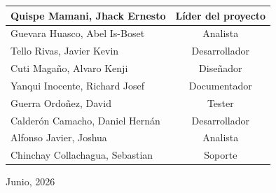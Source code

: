 \documentclass[11pt, a4paper, oneside]{report}
\begin{document}
\begin{titlepage}
\begin{tabular}{@{}|l|c|@{}}
    {\color{body_gray}\small Quispe Mamani, Jhack Ernesto} & {\color{body_gray}\small Líder del proyecto} \\ \hline
    {\color{body_gray}\small Guevara Huasco, Abel Is-Boset} & {\color{body_gray}\small Analista} \\ \hline
    {\color{body_gray}\small Tello Rivas, Javier Kevin} & {\color{body_gray}\small Desarrollador} \\ \hline
    {\color{body_gray}\small Cuti Magaño, Alvaro Kenji} & {\color{body_gray}\small Diseñador} \\ \hline
    {\color{body_gray}\small Yanqui Inocente, Richard Josef} & {\color{body_gray}\small Documentador} \\ \hline
    {\color{body_gray}\small Guerra Ordoñez, David} & {\color{body_gray}\small Tester} \\ \hline
    {\color{body_gray}\small Calderón Camacho, Daniel Hernán} & {\color{body_gray}\small Desarrollador} \\ \hline
    {\color{body_gray}\small Alfonso Javier, Joshua} & {\color{body_gray}\small Analista} \\ \hline
    {\color{body_gray}\small Chinchay Collachagua, Sebastian} & {\color{body_gray}\small Soporte} \\ \hline
  \end{tabular}

  \vspace{0.6cm}
  {\color{body_gray} Junio, 2026}

  \vspace*{\fill}

\end{titlepage}

\newpage
\thispagestyle{empty}
\vspace*{\fill}
\end{document}
